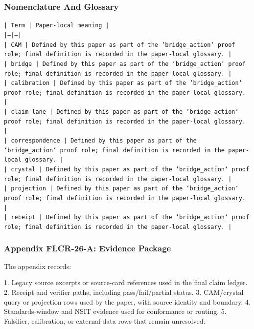 \documentclass[11pt]{article}
\begin{document}
\subsubsection*{Nomenclature And Glossary}

\noindent\texttt{| Term | Paper-local meaning |}\\
\noindent\texttt{|---|---|}\\
\noindent\texttt{| CAM | Defined by this paper as part of the `bridge\_action` proof role; final definition is recorded in the paper-local glossary. |}\\
\noindent\texttt{| bridge | Defined by this paper as part of the `bridge\_action` proof role; final definition is recorded in the paper-local glossary. |}\\
\noindent\texttt{| calibration | Defined by this paper as part of the `bridge\_action` proof role; final definition is recorded in the paper-local glossary. |}\\
\noindent\texttt{| claim lane | Defined by this paper as part of the `bridge\_action` proof role; final definition is recorded in the paper-local glossary. |}\\
\noindent\texttt{| correspondence | Defined by this paper as part of the `bridge\_action` proof role; final definition is recorded in the paper-local glossary. |}\\
\noindent\texttt{| crystal | Defined by this paper as part of the `bridge\_action` proof role; final definition is recorded in the paper-local glossary. |}\\
\noindent\texttt{| projection | Defined by this paper as part of the `bridge\_action` proof role; final definition is recorded in the paper-local glossary. |}\\
\noindent\texttt{| receipt | Defined by this paper as part of the `bridge\_action` proof role; final definition is recorded in the paper-local glossary. |}\\

\subsubsection*{Appendix FLCR-26-A: Evidence Package}

The appendix records:

1. Legacy source excerpts or source-card references used in the final claim ledger.
2. Receipt and verifier paths, including pass/fail/partial status.
3. CAM/crystal query or projection rows used by the paper, with source identity and boundary.
4. Standards-window and NSIT evidence used for conformance or routing.
5. Falsifier, calibration, or external-data rows that remain unresolved.
\end{document}
